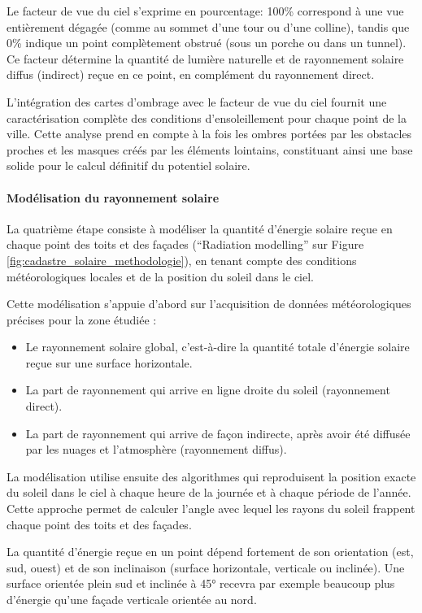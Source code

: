 Le facteur de vue du ciel s'exprime en pourcentage: 100\% correspond à une vue entièrement dégagée (comme au sommet d'une tour ou d'une colline), tandis que 0\% indique un point complètement obstrué (sous un porche ou dans un tunnel). Ce facteur détermine la quantité de lumière naturelle et de rayonnement solaire diffus (indirect) reçue en ce point, en complément du rayonnement direct.

L'intégration des cartes d'ombrage avec le facteur de vue du ciel fournit une caractérisation complète des conditions d'ensoleillement pour chaque point de la ville. Cette analyse prend en compte à la fois les ombres portées par les obstacles proches et les masques créés par les éléments lointains, constituant ainsi une base solide pour le calcul définitif du potentiel solaire.

\paragraph{Modélisation du rayonnement solaire}

La quatrième étape consiste à modéliser la quantité d'énergie solaire reçue en chaque point des toits et des façades (``Radiation modelling'' sur Figure \ref{fig:cadastre_solaire_methodologie}), en tenant compte des conditions météorologiques locales et de la position du soleil dans le ciel.

Cette modélisation s'appuie d'abord sur l'acquisition de données météorologiques précises pour la zone étudiée :
\begin{itemize}
    \item Le rayonnement solaire global, c'est-à-dire la quantité totale d'énergie solaire reçue sur une surface horizontale.
    \item La part de rayonnement qui arrive en ligne droite du soleil (rayonnement direct).
    \item La part de rayonnement qui arrive de façon indirecte, après avoir été diffusée par les nuages et l'atmosphère (rayonnement diffus).
\end{itemize}

La modélisation utilise ensuite des algorithmes qui reproduisent la position exacte du soleil dans le ciel à chaque heure de la journée et à chaque période de l'année. Cette approche permet de calculer l'angle avec lequel les rayons du soleil frappent chaque point des toits et des façades.

La quantité d'énergie reçue en un point dépend fortement de son orientation (est, sud, ouest) et de son inclinaison (surface horizontale, verticale ou inclinée). Une surface orientée plein sud et inclinée à 45° recevra par exemple beaucoup plus d'énergie qu'une façade verticale orientée au nord.

